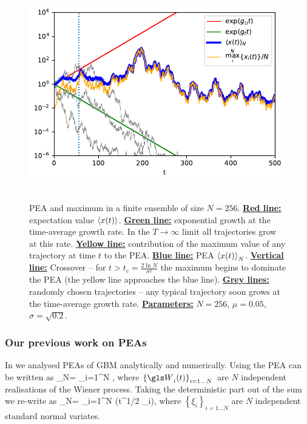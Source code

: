 \begin{figure}
\centering
\includegraphics[height=9.3cm]{./chapter_3/figs/trajectories.pdf}
\caption{PEA and maximum in a finite ensemble of size $N=256$. {\bf \underline{Red line:}} expectation value $\left\langle x(t) \right\rangle$. 
{\bf \underline{Green line:}} exponential growth at the time-average growth rate. In the $T\to\infty$ limit all trajectories grow at this rate. 
{\bf \underline{Yellow line:}} contribution of the maximum value of any trajectory at time $t$ to the PEA.  
{\bf \underline{Blue line:}} PEA $\left\langle x(t) \right\rangle_N$.
{\bf \underline{Vertical line:}} Crossover -- for $t>t_c=\frac{2\ln N}{\sigma^2}$ the maximum begins to dominate the PEA (the yellow line approaches the blue line).
{\bf \underline{Grey lines:}} randomly chosen trajectories -- any typical trajectory soon grows at the time-average growth rate.  
{\bf \underline{Parameters:}} $N=256$, $\mu=0.05$, $\sigma=\sqrt{0.2}$.}
\end{figure}
\FloatBarrier

\subsubsection{Our previous work on PEAs}
In \cite{PetersKlein2013} we analysed PEAs of GBM analytically and numerically. Using  the PEA can be written as
\be
{}_N= \sum_{i=1}^N \exp{},
\ee
where $\left\{\gW_i(t)\right\}_{i=1\dots N}$ are $N$ independent realisations of the Wiener process. Taking the deterministic part out of the sum we re-write  as
\be
{}_N=\exp{}  \sum_{i=1}^N \exp\left(t^{1/2} \sigma \xi_i\right),
\ee
where $\left\{\xi_i\right\}_{i=1\dots N}$ are $N$ independent standard normal variates.

